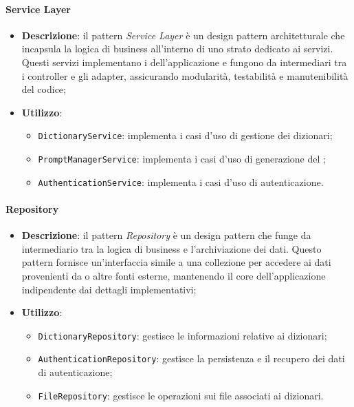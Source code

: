 \paragraph{Service Layer}
\begin{itemize}
    \item \textbf{Descrizione}: il pattern \textit{Service Layer} è un design pattern architetturale che incapsula la logica di business all'interno di uno strato dedicato ai servizi. Questi servizi implementano i  dell'applicazione e fungono da intermediari tra i controller e gli adapter, assicurando modularità, testabilità e manutenibilità del codice;
    \item \textbf{Utilizzo}:
    \begin{itemize}
        \item \texttt{DictionaryService}: implementa i casi d'uso di gestione dei dizionari;
        \item \texttt{PromptManagerService}: implementa i casi d'uso di generazione del ;
        \item \texttt{AuthenticationService}: implementa i casi d'uso di autenticazione.
    \end{itemize}
\end{itemize}

\paragraph{Repository}
\begin{itemize}
    \item \textbf{Descrizione}: il pattern \textit{Repository} è un design pattern che funge da intermediario tra la logica di business e l'archiviazione dei dati. Questo pattern fornisce un'interfaccia simile a una collezione per accedere ai dati provenienti da  o altre fonti esterne, mantenendo il core dell'applicazione indipendente dai dettagli implementativi;
    \item \textbf{Utilizzo}:
    \begin{itemize}
        \item \texttt{DictionaryRepository}: gestisce le informazioni relative ai dizionari;
        \item \texttt{AuthenticationRepository}: gestisce la persistenza e il recupero dei dati di autenticazione;
        \item \texttt{FileRepository}: gestisce le operazioni sui file associati ai dizionari.
    \end{itemize}
\end{itemize}



